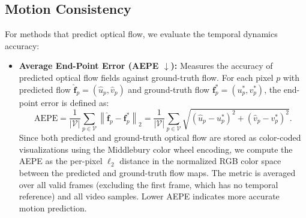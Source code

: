 \subsection{Motion Consistency}
For methods that predict optical flow, we evaluate the temporal dynamics accuracy:
\begin{itemize}[labelsep=0.6em, leftmargin=1.2em,itemindent=0em]
\item \textbf{Average End-Point Error (AEPE $\downarrow$):} Measures the accuracy of predicted optical flow fields against ground-truth flow. For each pixel $p$ with predicted flow $\hat{\mathbf{f}}_p = (\hat{u}_p, \hat{v}_p)$ and ground-truth flow $\mathbf{f}^*_p = (u^*_p, v^*_p)$, the end-point error is defined as:
\begin{equation}
\text{AEPE} = \frac{1}{|\mathcal{V}|} \sum_{p \in \mathcal{V}} \left\| \hat{\mathbf{f}}_p - \mathbf{f}^*_p \right\|_2 = \frac{1}{|\mathcal{V}|} \sum_{p \in \mathcal{V}} \sqrt{(\hat{u}_p - u^*_p)^2 + (\hat{v}_p - v^*_p)^2}.
\end{equation}
Since both predicted and ground-truth optical flow are stored as color-coded visualizations using the Middlebury color wheel encoding, we compute the AEPE as the per-pixel $\ell_2$ distance in the normalized RGB color space between the predicted and ground-truth flow maps. The metric is averaged over all valid frames (excluding the first frame, which has no temporal reference) and all video samples. Lower AEPE indicates more accurate motion prediction.
\end{itemize}  







